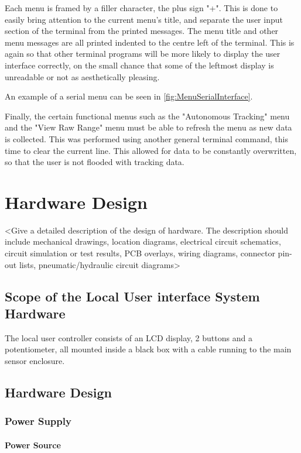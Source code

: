 \documentclass[]{report}
\begin{document}
Each menu is framed by a filler character, the plus sign "+". This is done to easily bring attention to the current menu's title, and separate the user input section of the terminal from the printed messages. The menu title and other menu messages are all printed indented to the centre left of the terminal. This is again so that other terminal programs will be more likely to display the user interface correctly, on the small chance that some of the leftmost display is unreadable or not as aesthetically pleasing.  

An example of a serial menu can be seen in \ref{fig:MenuSerialInterface}.

Finally, the certain functional menus such as the "Autonomous Tracking" menu and the "View Raw Range" menu must be able to refresh the menu as new data is collected. This was performed using another general terminal command, this time to clear the current line. This allowed for data to be constantly overwritten, so that the user is not flooded with tracking data.

\chapter{Hardware Design}
<Give a detailed description of the design of hardware. The description should include mechanical drawings, location diagrams, electrical circuit schematics, circuit simulation or test results, PCB overlays, wiring diagrams, connector pin-out lists, pneumatic/hydraulic circuit diagrams>

\section{Scope of the Local User interface System Hardware}
The local user controller consists of an LCD display, 2 buttons and a potentiometer, all mounted inside a black box with a cable running to the main sensor enclosure.

\section{Hardware Design}
\subsection{Power Supply}
\subsubsection{Power Source}
\end{document}
